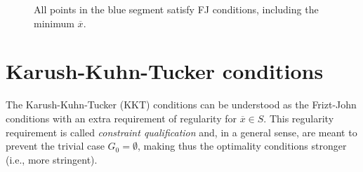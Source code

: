 \begin{figure}[h]
	\caption{All points in the blue segment satisfy FJ conditions, including the minimum $\overline{x}$.} \label{FJ-linear}
\end{figure}

 
\section{Karush-Kuhn-Tucker conditions}


The Karush-Kuhn-Tucker (KKT) conditions can be understood as the Frizt-John conditions with an extra requirement of regularity for $\overline{x} \in S$. This regularity requirement is called \emph{constraint qualification} and, in a general sense, are meant to prevent the trivial case $G_0 = \emptyset$, making thus the optimality conditions stronger (i.e., more stringent).

